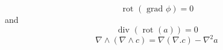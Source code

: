 \documentclass[12pt]{book}
\begin{document}
\begin{equation}
\mbox{ rot }(\mbox{ grad }\phi)=0
\end{equation}
and
\begin{equation}
\mbox{ div }(\mbox{ rot }(a))=0
\end{equation}
\begin{equation}
\nabla\wedge (\nabla\wedge c)=\nabla(\nabla.c)-\nabla^2a
\end{equation}








\end{document}
